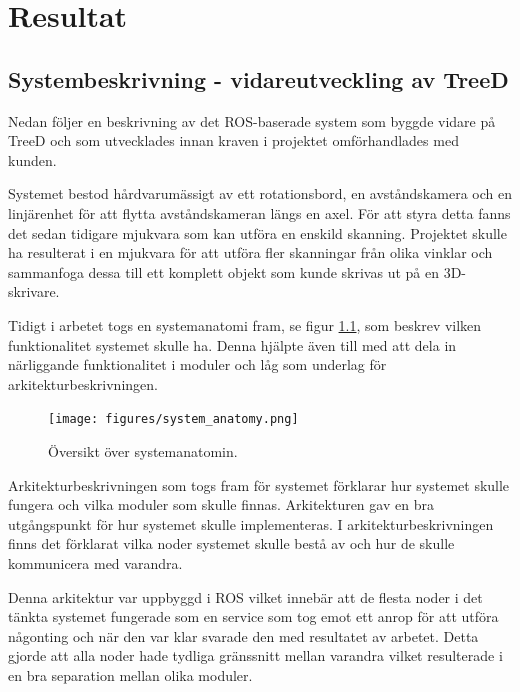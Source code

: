 \chapter{Resultat}
\label{cha:results}

\section{Systembeskrivning - vidareutveckling av TreeD}
\label{cha:results-systembeskrivning-treed}

Nedan följer en beskrivning av det ROS-baserade system som byggde vidare på TreeD och som utvecklades innan kraven i projektet omförhandlades med kunden.

Systemet bestod hårdvarumässigt av ett rotationsbord, en avståndskamera och en linjärenhet för att flytta avståndskameran längs en axel. För att styra detta fanns det sedan tidigare mjukvara som kan utföra en enskild skanning. Projektet skulle ha resulterat i en mjukvara för att utföra fler skanningar från olika vinklar och sammanfoga dessa till ett komplett objekt som kunde skrivas ut på en 3D-skrivare.

Tidigt i arbetet togs en systemanatomi fram, se figur \ref{fig:system_anatomy}, som beskrev vilken funktionalitet systemet skulle ha. Denna hjälpte även till med att dela in närliggande funktionalitet i moduler och låg som underlag för arkitekturbeskrivningen.

\begin{figure}[H]
	\centering{\tiny }
	\texttt{[image: figures/system\_anatomy.png]}
	\caption{Översikt över systemanatomin.}
	\label{fig:system_anatomy}
\end{figure}

Arkitekturbeskrivningen som togs fram för systemet förklarar hur systemet skulle fungera och vilka moduler som skulle finnas. Arkitekturen gav en bra utgångspunkt för hur systemet skulle implementeras. I arkitekturbeskrivningen finns det förklarat vilka noder systemet skulle bestå av och hur de skulle kommunicera med varandra.

Denna arkitektur var uppbyggd i ROS vilket innebär att de flesta noder i det tänkta systemet fungerade som en service som tog emot ett anrop för att utföra någonting och när den var klar svarade den med resultatet av arbetet. Detta gjorde att alla noder hade tydliga gränssnitt mellan varandra vilket resulterade i en bra separation mellan olika moduler.

